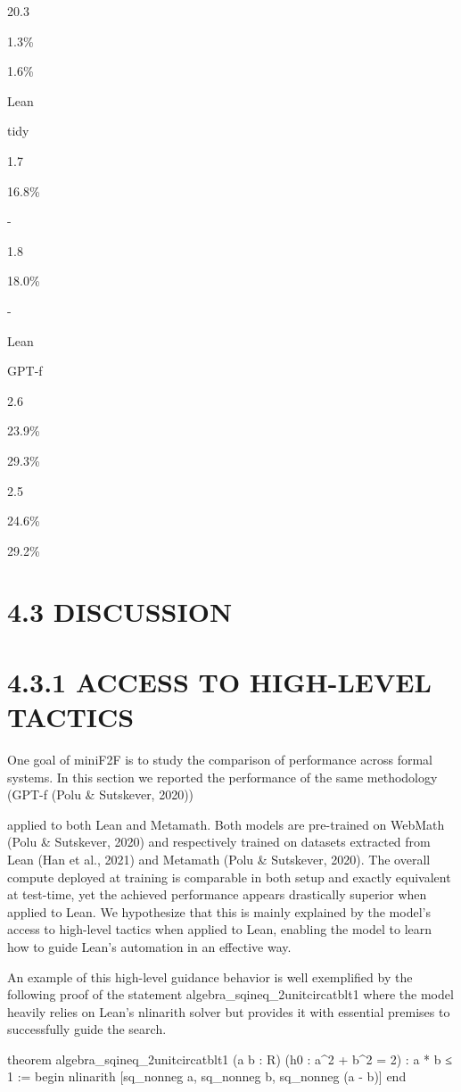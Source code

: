 \documentclass[
]{article}
\newenvironment{Shaded}{}{}
\newcommand{\NormalTok}[1]{#1}
\begin{document}
20.3

1.3\%

1.6\%

Lean

tidy

1.7

16.8\%

-

1.8

18.0\%

-

Lean

GPT-f

2.6

23.9\%

29.3\%

2.5

24.6\%

29.2\%

\section{4.3 DISCUSSION}\label{discussion}

\section{4.3.1 ACCESS TO HIGH-LEVEL
TACTICS}\label{access-to-high-level-tactics}

One goal of miniF2F is to study the comparison of performance across
formal systems. In this section we reported the performance of the same
methodology (GPT-f (Polu \& Sutskever, 2020))

applied to both Lean and Metamath. Both models are pre-trained on
WebMath (Polu \& Sutskever, 2020) and respectively trained on datasets
extracted from Lean (Han et al., 2021) and Metamath (Polu \& Sutskever,
2020). The overall compute deployed at training is comparable in both
setup and exactly equivalent at test-time, yet the achieved performance
appears drastically superior when applied to Lean. We hypothesize that
this is mainly explained by the model's access to high-level tactics
when applied to Lean, enabling the model to learn how to guide Lean's
automation in an effective way.

An example of this high-level guidance behavior is well exemplified by
the following proof of the statement algebra\_sqineq\_2unitcircatblt1
where the model heavily relies on Lean's nlinarith solver but provides
it with essential premises to successfully guide the search.

\begin{Shaded}
\begin{Highlighting}[]
\NormalTok{theorem algebra\_sqineq\_2unitcircatblt1}
\NormalTok{(a b : R)}
\NormalTok{(h0 : a\^{}2 + b\^{}2 = 2) :}
\NormalTok{a * b ≤ 1 :=}
\NormalTok{begin}
\NormalTok{nlinarith [sq\_nonneg a, sq\_nonneg b, sq\_nonneg (a {-} b)]}
\NormalTok{end }
\end{Highlighting}
\end{Shaded}
\end{document}
